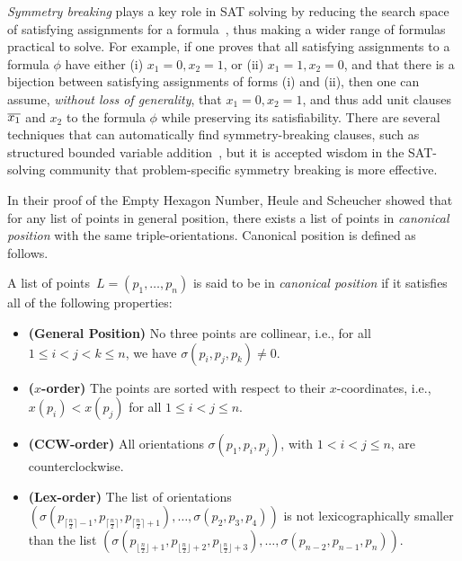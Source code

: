 \emph{Symmetry breaking} plays a key role in SAT solving by reducing the search space of satisfying assignments for a formula~\cite{biereHandbookSatisfiabilityVolume2009,Crawford},
thus making a wider range of formulas practical to solve.
For example, if one proves that all satisfying assignments to a formula $\phi$ have either (i) $x_1 = 0, x_2 = 1$, or  (ii) $x_1 = 1, x_2 = 0$, and that there is a bijection between satisfying assignments of forms (i) and (ii),
then one can assume, \emph{without loss of generality}, that $x_1 = 0, x_2 = 1$, and thus add unit clauses $\overline{x_1}$ and $x_2$ to the formula $\phi$ while preserving its satisfiability.
There are several techniques that can automatically find symmetry-breaking clauses,
such as structured bounded variable addition~\cite{sbva},
but it is accepted wisdom in the SAT-solving community that problem-specific symmetry breaking is more effective.

In their proof of the Empty Hexagon Number,
Heule and Scheucher showed that for any list of points in general position,
there exists a list of points in \emph{canonical position} with the same triple-orientations.
Canonical position is defined as follows.
\begin{definition}
A list of points~$L = (p_1,\ldots, p_{n})$ is said to be in \emph{canonical position} if it satisfies all of the following properties:
\begin{itemize}
    \item \textbf{(General Position)} No three points are collinear, i.e., for all $1 \leq i < j < k \leq n$, we have $\sigma(p_i, p_j, p_k) \neq 0$.
    \item \textbf{($x$-order)} The points are sorted with respect to their $x$-coordinates, i.e., $x(p_i) < x(p_j)$ for all $1 \leq i < j \leq n$.
    \item \textbf{(CCW-order)} All orientations $\sigma(p_1, p_i, p_j)$, with $1 < i < j \leq n$, are counterclockwise.
    \item \textbf{(Lex-order)} The list of orientations \( \left(\sigma\left(p_{\lceil \frac{n}{2} \rceil -1}, p_{\lceil \frac{n}{2} \rceil},p_{\lceil \frac{n}{2} \rceil+1}\right), \ldots, \sigma\left(p_2, p_3, p_4\right) \right)\) is not lexicographically smaller than the list \(\left(\sigma\left(p_{\lfloor \frac{n}{2} \rfloor  + 1}, p_{\lfloor \frac{n}{2} \rfloor+2},p_{\lfloor \frac{n}{2} \rfloor+3}\right), \ldots, \sigma\left(p_{n-2}, p_{n-1}, p_{n}\right) \right).\)
\end{itemize}
\end{definition}

